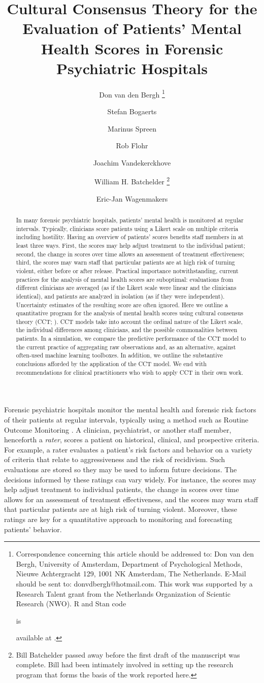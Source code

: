 \documentclass[a4paper,usenames,dvipsnames]{article}
\title{Cultural Consensus Theory for the Evaluation of Patients' Mental Health Scores in Forensic Psychiatric Hospitals}
\author[1]{Don van den Bergh%
\thanks{Correspondence concerning this article should be addressed to: Don van den Bergh, University of Amsterdam, Department of Psychological Methods, Nieuwe Achtergracht 129, 1001 NK Amsterdam, The Netherlands. E-Mail should be sent to: donvdbergh@hotmail.com. This work was supported by a Research Talent grant from the Netherlands Organization of Scientic Research (NWO). R and Stan code \protect\begin{revision}is\protect\end{revision} available at \osflink{}.
}}
\author[2]{Stefan Bogaerts}
\author[3]{Marinus Spreen}
\author[3]{\authorcr Rob Flohr}
\author[4]{Joachim Vandekerckhove}
\author[4]{\authorcr William H. Batchelder%
\thanks{Bill Batchelder passed away before the first draft of the manuscript was complete. Bill had been intimately involved in setting up the research program that forms the basis of the work reported here.}}
\author[1]{Eric-Jan Wagenmakers}
\affil[1]{University of Amsterdam}
\affil[2]{University of Tilburg}
\affil[3]{NHL Stenden University of Applied Sciences}
\affil[4]{University of California Irvine}
\date{}
\begin{document}
\maketitle

\begin{abstract}
In many forensic psychiatric hospitals, patients' mental health is monitored at regular intervals. Typically, clinicians score patients using a Likert scale on multiple criteria including hostility. Having an overview of patients’ scores benefits staff members in at least three ways. First, the scores may help adjust treatment to the individual patient; second, the change in scores over time allows an assessment of treatment effectiveness; third, the scores may warn staff that particular patients are at high risk of turning violent, either before or after release. Practical importance notwithstanding, current practices for the analysis of mental health scores are suboptimal: evaluations from different clinicians are averaged (as if the Likert scale were linear and the clinicians identical), and patients are analyzed in isolation (as if they were independent). Uncertainty estimates of the resulting score are often ignored. Here we outline a quantitative program for the analysis of mental health scores using cultural consensus theory (CCT; ). CCT models take into account the ordinal nature of the Likert scale, the individual differences among clinicians, and the possible commonalities between patients. In a simulation, we compare the predictive performance of the CCT model to the current practice of aggregating raw observations and, as an alternative, against often-used machine learning toolboxes. In addition, we outline the substantive conclusions afforded by the application of the CCT model. We end with recommendations for clinical practitioners who wish to apply CCT in their own work.
\end{abstract}
\newpage

Forensic psychiatric hospitals monitor the mental health and forensic risk factors of their patients at regular intervals, typically using a method such as Routine Outcome Monitoring \cite{deBeurs2011ROM}. A clinician, psychiatrist, or another staff member, henceforth a \textit{rater}, scores a patient on historical, clinical, and prospective criteria. For example, a rater evaluates a patient's risk factors and behavior on a variety of criteria that relate to aggressiveness and the risk of recidivism. Such evaluations are stored so they may be used to inform future decisions. The decisions informed by these ratings can vary widely. For instance, the scores may help adjust treatment to individual patients, the change in scores over time allows for an assessment of treatment effectiveness, and the scores may warn staff that particular patients are at high risk of turning violent. Moreover, these ratings are key for a quantitative approach to monitoring and forecasting patients' behavior.
\end{document}
